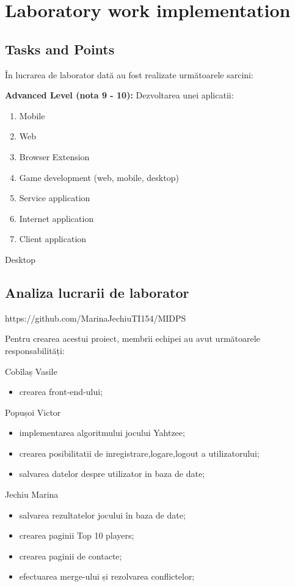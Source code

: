 \section{Laboratory work implementation}

\subsection{Tasks and Points}

În lucrarea de laborator dată au fost realizate următoarele sarcini:
\begin{enumerate}
\textbf{Advanced Level (nota 9 - 10):}
Dezvoltarea unei aplicatii:

\begin{enumerate}
\item  Mobile
\item  Web
\item  Browser Extension
\item  Game development (web, mobile, desktop)
\item  Service application
\item  Internet application
\item  Client application
\end{enumerate}Desktop


\subsection{Analiza lucrarii de laborator}

https://github.com/MarinaJechiuTI154/MIDPS
	
	Pentru crearea acestui proiect, membrii echipei au avut următoarele responsabilități:

	Cobîlaș Vasile
	\begin{itemize}
	\item crearea front-end-ului;
	\end{itemize}
	
	Popușoi Victor
	\begin{itemize}
	\item implementarea algoritmului jocului Yahtzee;
	\item crearea posibilitatii de inregistrare,logare,logout a utilizatorului;
	\item salvarea datelor despre utilizator in baza de date;
	\end{itemize}
	
	Jechiu Marina
	\begin{itemize}
	\item salvarea rezultatelor jocului în baza de date;
	\item crearea paginii Top 10 players;
	\item crearea paginii de contacte;
	\item efectuarea merge-ului și rezolvarea conflictelor;
	\end{itemize}
	

\end{enumerate}
